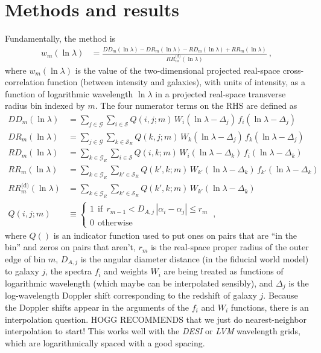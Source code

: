\documentclass{article}
\newcommand{\project}[1]{\textsl{#1}}
\newcommand{\set}[1]{\mathscr{#1}}
\begin{document}
\section{Methods and results}\label{sec:method}
Fundamentally, the method is
\begin{align}
    w_m(\ln\lambda) &= \frac{DD_m(\ln\lambda) - DR_m(\ln\lambda) - RD_m(\ln\lambda) + RR_m(\ln\lambda)}{RR^\text{(d)}_m(\ln\lambda)} ~,\label{eq:ls}
\end{align}
where $w_m(\ln\lambda)$ is the value of the two-dimensional projected real-space cross-correlation function (between intensity and galaxies), with units of intensity, as a function of logarithmic wavelength $\ln\lambda$ in a projected real-space transverse radius bin indexed by $m$.
The four numerator terms on the RHS are defined as
\begin{align}
    DD_m(\ln\lambda) &= 
    \sum_{j\in\set{G}}\sum_{i\in\set{S}} Q(i,j;m)\,W_i(\ln\lambda-\Delta_j)\,f_i(\ln\lambda-\Delta_j) \\
    DR_m(\ln\lambda) &= 
    \sum_{j\in\set{G}}\sum_{k\in\set{S}_R} Q(k,j;m)\,W_k(\ln\lambda-\Delta_j)\,f_k(\ln\lambda-\Delta_j) \\
    RD_m(\ln\lambda) &= 
    \sum_{k\in\set{G}_R}\sum_{i\in\set{S}} Q(i,k;m)\,W_i(\ln\lambda-\Delta_k)\,f_i(\ln\lambda-\Delta_k) \\
    RR_m(\ln\lambda) &= 
    \sum_{k\in\set{G}_R}\sum_{k'\in\set{S}_R} Q(k',k;m)\,W_{k'}(\ln\lambda-\Delta_k)\,f_{k'}(\ln\lambda-\Delta_k) \\
    RR^\text{(d)}_m(\ln\lambda) &= 
    \sum_{k\in\set{G}_R}\sum_{k'\in\set{S}_R} Q(k',k;m)\,W_{k'}(\ln\lambda-\Delta_k) \\
    Q(i,j;m) &\equiv\left\{\begin{array}{l}1~~\text{if}~~r_{m-1}<D_{A,j}\,|\alpha_i-\alpha_j|\leq r_m \\ 0~~\text{otherwise}\end{array}\right.~,
\end{align}
where
$Q()$ is an indicator function used to put ones on pairs that are ``in the bin'' and zeros on pairs that aren't,
$r_m$ is the real-space proper radius of the outer edge of bin $m$,
$D_{A,j}$ is the angular diameter distance (in the fiducial world model) to galaxy $j$,
the spectra $f_i$ and weights $W_i$ are being treated as functions of logarithmic wavelength (which maybe can be interpolated sensibly),
and $\Delta_j$ is the log-wavelength Doppler shift corresponding to the redshift of galaxy $j$.
Because the Doppler shifts appear in the arguments of the $f_i$ and $W_i$ functions, there is an interpolation question.
HOGG RECOMMENDS that we just do nearest-neighbor interpolation to start!
This works well with the \project{DESI} or \project{LVM} wavelength grids, which are logarithmically spaced with a good spacing.
\end{document}

